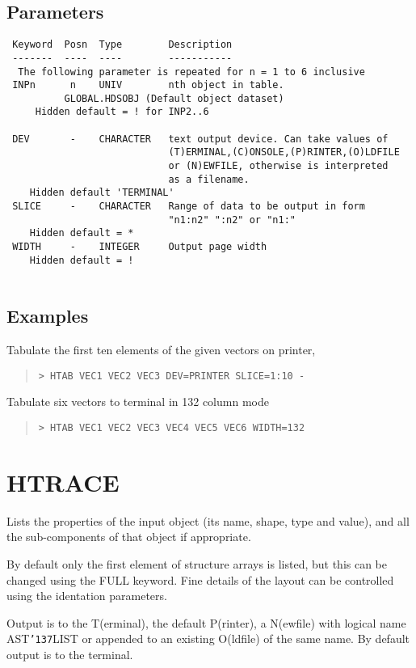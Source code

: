 \documentclass{book}
\renewcommand{\_}{{\tt\char'137}}     %
\begin{document}
\subsection{Parameters}
\begin{verbatim}
 Keyword  Posn  Type        Description
 -------  ----  ----        -----------
  The following parameter is repeated for n = 1 to 6 inclusive
 INPn      n    UNIV        nth object in table.
          GLOBAL.HDSOBJ (Default object dataset)
     Hidden default = ! for INP2..6
 
 DEV       -    CHARACTER   text output device. Can take values of
                            (T)ERMINAL,(C)ONSOLE,(P)RINTER,(O)LDFILE
                            or (N)EWFILE, otherwise is interpreted
                            as a filename.
    Hidden default 'TERMINAL'
 SLICE     -    CHARACTER   Range of data to be output in form
                            "n1:n2" ":n2" or "n1:"
    Hidden default = *
 WIDTH     -    INTEGER     Output page width
    Hidden default = !
 
\end{verbatim}\subsection{Examples}
Tabulate the first ten elements of the given vectors on printer,
\begin{quote}\begin{verbatim}
> HTAB VEC1 VEC2 VEC3 DEV=PRINTER SLICE=1:10 -
\end{verbatim}\end{quote}
Tabulate six vectors to terminal in 132 column mode
\begin{quote}\begin{verbatim}
> HTAB VEC1 VEC2 VEC3 VEC4 VEC5 VEC6 WIDTH=132
\end{verbatim}\end{quote}
\section{HTRACE}
Lists the properties of the input object (its name, shape, type
and value), and all the sub-components of that object if
appropriate.
 
By default only the first element of structure arrays is listed,
but this can be changed using the FULL keyword. Fine details of
the layout can be controlled using the identation parameters.
 
Output is to the T(erminal), the default P(rinter), a N(ewfile)
with logical name AST\_LIST or appended to an existing O(ldfile)
of the same name. By default output is to the terminal.
 
\end{document}
